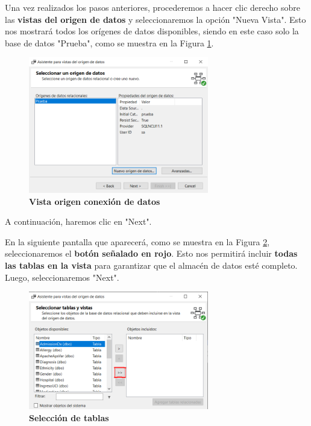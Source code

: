 \documentclass[12pt, a4paper, twoside]{article}
\begin{document}
Una vez realizados los pasos anteriores, procederemos a hacer clic derecho sobre las \textbf{vistas del origen de datos} y seleccionaremos la opción "Nueva Vista". Esto nos mostrará todos los orígenes de datos disponibles, siendo en este caso solo la base de datos "Prueba", como se muestra en la Figura \ref{fig:4}.

\begin{figure}[H]
	\centering
	\includegraphics[width=0.7\textwidth]{image/vistaOrigenConexion}
	\caption{\textbf{Vista origen conexión de datos}}
	\label{fig:4}
\end{figure}

A continuación, haremos clic en "Next".

En la siguiente pantalla que aparecerá, como se muestra en la Figura \ref{fig:5}, seleccionaremos el \textbf{botón señalado en rojo}. Esto nos permitirá incluir \textbf{todas las tablas en la vista} para garantizar que el almacén de datos esté completo. Luego, seleccionaremos "Next".

\begin{figure}[H]
	\centering
	\includegraphics[width=0.7\textwidth]{image/seleccionTablas}
	\caption{\textbf{Selección de tablas}}
	\label{fig:5}
\end{figure}
\end{document}

